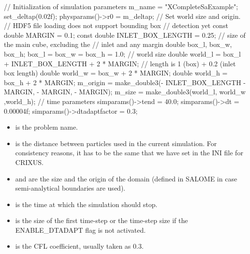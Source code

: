 \documentclass{../GPUSPHtemplate}
\begin{document}
\begin{ccode}
// Initialization of simulation parameters
m_name = "XCompleteSaExample";
set_deltap(0.02f);
physparams()->r0 = m_deltap;
// Set world size and origin.
// HDF5 file loading does not support bounding box 
// detection yet
const double MARGIN = 0.1;
const double INLET_BOX_LENGTH = 0.25;
// size of the main cube, excluding the 
// inlet and any margin
double box_l, box_w, box_h;
box_l = box_w = box_h = 1.0;
// world size
double world_l = box_l + INLET_BOX_LENGTH 
    + 2 * MARGIN; // length is 1 (box) + 0.2 (inlet box length)
double world_w = box_w + 2 * MARGIN;
double world_h = box_h + 2 * MARGIN;
m_origin = make_double3(- INLET_BOX_LENGTH - MARGIN,
    - MARGIN, - MARGIN);
m_size = make_double3(world_l, world_w ,world_h);
// time parameters
simparams()->tend = 40.0;
simparams()->dt = 0.00004f;
simparams()->dtadaptfactor = 0.3;
\end{ccode}

\begin{itemize}
\item {} is the problem name.

\item {} is the distance between particles used in the current simulation. 
For consistency reasons, it has to be the same that we have set in the INI file for CRIXUS.

\item {} and  are the size and the origin of the domain 
(defined in SALOME in case semi-analytical boundaries are used).

\item {} is the time at which the simulation should stop.

\item {} is the size of the first time-step or the time-step size if the ENABLE\_DTADAPT
flag is not activated.

\item {} is the CFL coefficient, usually taken as 0.3.

\end{itemize}
\end{document}
